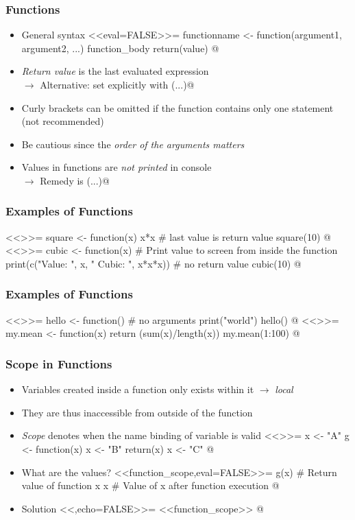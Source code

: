 \documentclass[%
  final,
  11pt, 
  show notes, %
  t, %
  fleqn, %
]{beamer}
\begin{document}
\begin{frame}[fragile]
  \frametitle{Functions}
\begin{itemize}
\item General syntax
<<eval=FALSE>>=
functionname <- function(argument1, argument2, ...) { 
  function_body
  return(value)
}
@
\item \emph{Return value} is the last evaluated expression\\
$\rightarrow$ Alternative: set explicitly with \verb@return(...)@
\item Curly brackets can be omitted if the function contains only one statement (not recommended)
\item Be cautious since the \emph{order of the arguments matters}
\item Values in functions are \emph{not printed} in console\\
$\rightarrow$ Remedy is \verb@print(...)@
\end{itemize}
\end{frame}

\begin{frame}[fragile]
  \frametitle{Examples of Functions}
<<>>=
square <- function(x) x*x # last value is return value
square(10)
@
<<>>=
cubic <- function(x) {
  # Print value to screen from inside the function
  print(c("Value: ", x, " Cubic: ", x*x*x))
  # no return value
}
cubic(10)
@
\end{frame}

\begin{frame}[fragile]
  \frametitle{Examples of Functions}
<<>>=
hello <- function() { # no arguments
  print("world")
}
hello()
@
<<>>= 
my.mean <- function(x) {
  return (sum(x)/length(x))
}
my.mean(1:100)
@
\end{frame}

\begin{frame}[fragile]
  \frametitle{Scope in Functions}
\begin{itemize}
\item Variables created inside a function only exists within it $\rightarrow$ \emph{local}
\item They are thus inaccessible from outside of the function
\item \emph{Scope} denotes when the name binding of variable is valid
<<>>=
x <- "A"
g <- function(x) {
  x <- "B"
  return(x)
}
x <- "C"
@
\item What are the values?
<<function_scope,eval=FALSE>>=
g(x) # Return value of function x
x    # Value of x after function execution
@
\pause
\item Solution
<<,echo=FALSE>>=
<<function_scope>>
@
\end{itemize}
\end{frame}
\end{document}
